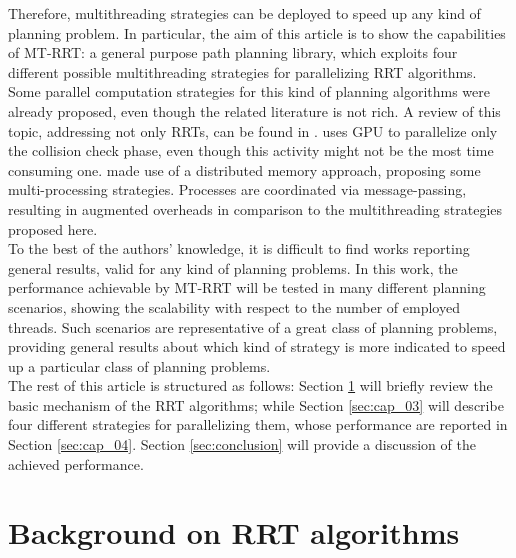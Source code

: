 \documentclass[letterpaper, 10 pt, conference]{ieeeconf}  %
\begin{document}
Therefore, multithreading strategies can be deployed to speed up any kind of planning problem.
In particular, the aim of this article is to show the capabilities of MT-RRT: a general purpose path planning library, which exploits four different possible multithreading strategies for parallelizing RRT algorithms. 
\\
Some parallel computation strategies for this kind of planning algorithms were already proposed, even though the related literature is not rich.
A review of this topic, addressing not only RRTs, can be found in \cite{Planning_parall_review}.
\cite{RRT_GPU} uses GPU to parallelize only the collision check phase, even though this activity might not be the most time consuming one. 
\cite{RRT_MPI} made use of a distributed memory approach, proposing some multi-processing strategies. Processes are coordinated via message-passing, resulting in augmented overheads in comparison to the multithreading strategies proposed here.  
\\
To the best of the authors' knowledge, it is difficult to find works reporting general results, valid for any kind of planning problems. In this work, the performance achievable by MT-RRT will be tested in many different planning scenarios, showing the scalability with respect to the number of employed threads. Such scenarios are representative of a great class of planning problems, providing general results about which kind of strategy is more indicated to speed up a particular class of planning problems. 
\\
The rest of this article is structured as follows:
Section \ref{sec:cap_02} will briefly review the basic mechanism of the RRT algorithms; while Section \ref{sec:cap_03} will describe four different strategies for parallelizing them, whose performance are reported in Section \ref{sec:cap_04}.
Section \ref{sec:conclusion} will provide a discussion of the achieved performance.




\section{Background on RRT algorithms}
\label{sec:cap_02}

\end{document}
